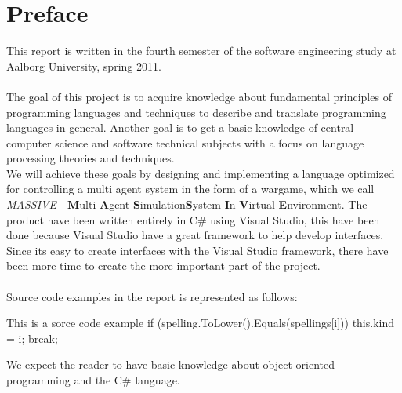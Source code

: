 \chapter*{Preface}
This report is written in the fourth semester of the software engineering study at Aalborg University, spring 2011.
\\
\\
The goal of this project is to acquire knowledge about fundamental principles of programming languages and techniques to describe and translate programming languages in general. Another goal is to get a basic knowledge of central computer science and software technical subjects with a focus on language processing theories and techniques.\\ \indent
  We will achieve these goals by designing and implementing a language optimized for controlling a multi agent system in the form of a wargame, which we call \textit{MASSIVE} - \textbf{M}ulti \textbf{A}gent \textbf{S}imulation\textbf{S}ystem \textbf{I}n \textbf{V}irtual \textbf{E}nvironment. The product have been written entirely in C\# using Visual Studio, this have been done because Visual Studio have a great framework to help develop interfaces. Since its easy to create interfaces with the Visual Studio framework, there have been more time to create the more important part of the project.
	\\
	\\

Source code examples in the report is represented as follows:
\begin{source}{This is a sorce code example}{}
if (spelling.ToLower().Equals(spellings[i]))
	{
		this.kind = i;
		break;
	}
\end{source}

We expect the reader to have basic knowledge about object oriented programming and the C\# language.